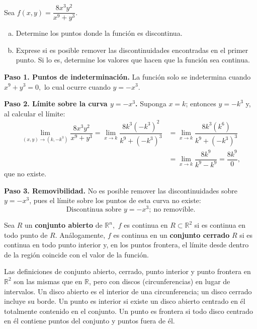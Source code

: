 \begin{prob}
Sea $f(x,y)=\dfrac{8x^3y^2}{x^9+y^3}.$
\begin{enumerate}[(a)]
    \item Determine los puntos donde la función es discontinua.
    \item Exprese si es posible remover las discontinuidades encontradas en el primer punto. Si lo es, determine los valores que hacen que la función sea continua. 
\end{enumerate}
\begin{myproof}
\textbf{Paso 1. Puntos de indeterminación.} La función solo se indetermina cuando $x^9+y^3=0,$ lo cual ocurre cuando $y=-x^3.$

\textbf{Paso 2. Límite sobre la curva $y=-x^3$.} Suponga $x=k$; entonces $y=-k^3$ y, al calcular el límite:
 \begin{align*}
\displaystyle\lim_{(x,y)\to (k,-k^3)} \dfrac{8x^3y^2}{x^9+y^3} = \displaystyle\lim_{x\to k}\dfrac{8k^3(-k^3)^2}{k^9+(-k^3)^3}&=\displaystyle\lim_{x\to k}\dfrac{8k^3(k^6)}{k^9+(-k^3)^3}\\&=\displaystyle\lim_{x\to k}\dfrac{8k^9}{k^9-k^9}=\displaystyle\dfrac{8k^9}{0},
\end{align*}
que no existe.

\textbf{Paso 3. Removibilidad.} No es posible remover las discontinuidades sobre $y=-x^3$, pues el límite sobre los puntos de esta curva no existe:
\[
\boxed{\text{Discontinua sobre } y=-x^3;\ \text{no removible.}}
\]
\end{myproof}
\end{prob}

\begin{definition}
Sea $R$ un \textbf{conjunto abierto} de $\mathbb{R}^n,$ $f$ es continua en $R\subset\mathbb{R}^2$ si es continua en todo punto de $R$. Análogamente, $f$ es continua en un \textbf{conjunto cerrado} $R$ si es continua en todo punto interior y, en los puntos frontera, el límite desde dentro de la región coincide con el valor de la     función.
\end{definition}

\begin{rem}
Las definiciones de conjunto abierto, cerrado, punto interior y punto
frontera en $\mathbb{R}^2$ son las mismas que en $\mathbb{R}$, pero
con discos (circunferencias) en lugar de intervalos. Un disco abierto
es el interior de una circunferencia; un disco cerrado incluye su
borde. Un punto es interior si existe un disco abierto centrado en él
totalmente contenido en el conjunto. Un punto es frontera si todo
disco centrado en él contiene puntos del conjunto y puntos fuera de él.
\end{rem}

